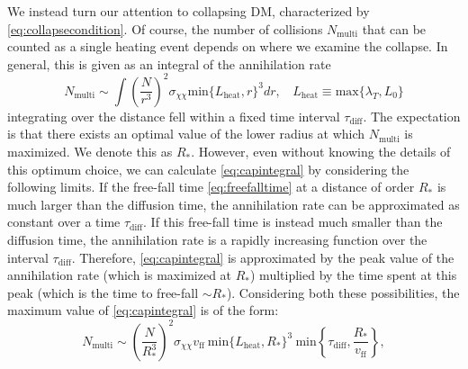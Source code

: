 \documentclass[preprintnumbers,amsmath,amssymb,prd,superscriptaddress]{revtex4}
\def\r{\right)}
\def\l{\left(}
\begin{document}
We instead turn our attention to collapsing DM, characterized by \eqref{eq:collapsecondition}. 
Of course, the number of collisions $N_\text{multi}$ that can be counted as a single heating event depends on where we examine the collapse. 
In general, this is given as an integral of the annihilation rate
\begin{equation}
\label{eq:capintegral}
N_\text{multi} \sim \int \l \frac{N}{r^3}\r^2 \sigma_{\chi \chi} \text{min}\{L_\text{heat}, r\}^3 dr, ~~~~ L_\text{heat} \equiv \text{max}\{\lambda_T, L_0\}
\end{equation}
integrating over the distance fell within a fixed time interval $\tau_\text{diff}$. 
The expectation is that there exists an optimal value of the lower radius at which $N_\text{multi}$ is maximized.
We denote this as $R_*$. 
However, even without knowing the details of this optimum choice, we can calculate \eqref{eq:capintegral} by considering the following limits. 
If the free-fall time \eqref{eq:freefalltime} at a distance of order $R_*$ is much larger than the diffusion time, the annihilation rate can be approximated as constant over a time $\tau_\text{diff}$.
If this free-fall time is instead much smaller than the diffusion time, the annihilation rate is a rapidly increasing function over the interval $\tau_\text{diff}$.
Therefore, \eqref{eq:capintegral} is approximated by the peak value of the annihilation rate (which is maximized at $R_*$) multiplied by the time spent at this peak (which is the time to free-fall $\sim R_*$).
Considering both these possibilities, the maximum value of \eqref{eq:capintegral} is of the form: 
\begin{equation}
\label{eq:nmulti}
N_\text{multi} \sim \l \frac{N}{R_*^3}\r^2  \sigma_{\chi \chi} v_\text{ff} ~\text{min}\{L_\text{heat}, R_*\}^3 ~\text{min}\left \{\tau_\text{diff}, \frac{R_*}{v_\text{ff}}\right \},
\end{equation}
\end{document}
